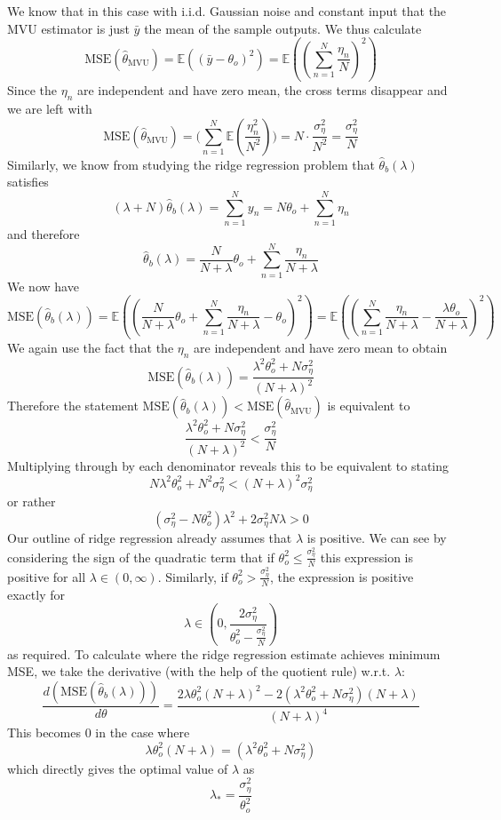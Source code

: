 \documentclass{article}
\newcommand{\chapternumber}{3}
\newenvironment{QandA}{\begin{enumerate}[label=\chapternumber.\arabic*]\bfseries\boldmath}
	{\end{enumerate}}
\newenvironment{answered}{\par\bigskip\normalfont\unboldmath}{}
\begin{document}
\begin{QandA}
	\begin{answered}
		We know that in this case with i.i.d. Gaussian noise and constant input that the MVU estimator is just $\bar{y}$ the mean of the sample outputs. We thus calculate
		\[\text{MSE}(\hat{\theta}_\text{MVU})=\mathbb{E}((\bar{y}-\theta_o)^2)=\mathbb{E}((\sum_{n=1}^{N}\frac{\eta_n}{N})^2)\]
		Since the $\eta_n$ are independent and have zero mean, the cross terms disappear and we are left with
		\[\text{MSE}(\hat{\theta}_\text{MVU})=\mathbb(\sum_{n=1}^{N}\mathbb{E}(\frac{\eta_n^2}{N^2}))=N\cdot\frac{\sigma_\eta^2}{N^2}=\frac{\sigma_\eta^2}{N}\]
		Similarly, we know from studying the ridge regression problem that $\hat{\theta}_b(\lambda)$ satisfies
		\[(\lambda+N)\hat{\theta}_b(\lambda)= \sum_{n=1}^{N}y_n=N\theta_o+\sum_{n=1}^{N}\eta_n\] 
		and therefore
		\[\hat{\theta}_b(\lambda)=\frac{N}{N+\lambda}\theta_o+\sum_{n=1}^{N}\frac{\eta_n}{N+\lambda}\]
		We now have
		\[\text{MSE}(\hat{\theta}_b(\lambda))=\mathbb{E}\left(\left(\frac{N}{N+\lambda}\theta_o+\sum_{n=1}^{N}\frac{\eta_n}{N+\lambda}-\theta_o\right)^2\right)=\mathbb{E}\left(\left(\sum_{n=1}^{N}\frac{\eta_n}{N+\lambda}-\frac{\lambda\theta_o}{N+\lambda}\right)^2\right)\]
		We again use the fact that the $\eta_n$ are independent and have zero mean to obtain
		\[\text{MSE}(\hat{\theta}_b(\lambda))=\frac{\lambda^2\theta_o^2+N\sigma_\eta^2}{(N+\lambda)^2}\]
		Therefore the statement $\text{MSE}(\hat{\theta}_b(\lambda))<\text{MSE}(\hat{\theta}_\text{MVU})$ is equivalent to
		\[\frac{\lambda^2\theta_o^2+N\sigma_\eta^2}{(N+\lambda)^2}<\frac{\sigma_\eta^2}{N}\]
		Multiplying through by each denominator reveals this to be equivalent to stating
		\[N\lambda^2\theta_o^2+N^2\sigma_\eta^2<(N+\lambda)^2\sigma_\eta^2\]
		or rather
		\[(\sigma_\eta^2-N\theta_o^2)\lambda^2+2\sigma_\eta^2N\lambda>0\]
		Our outline of ridge regression already assumes that $\lambda$ is positive. We can see by considering the sign of the quadratic term that if $\theta_o^2\leq\frac{\sigma_\eta^2}{N}$ this expression is positive for all $\lambda\in(0,\infty)$. Similarly, if $\theta_o^2>\frac{\sigma_\eta^2}{N}$, the expression is positive exactly for \[\lambda\in\left(0,\frac{2\sigma_\eta^2}{\theta_o^2-\frac{\sigma_\eta^2}{N}}\right)\]
		as required.
		To calculate where the ridge regression estimate achieves minimum MSE, we take the derivative (with the help of the quotient rule) w.r.t. $\lambda$:
		\[\frac{d(\text{MSE}(\hat{\theta}_b(\lambda)))}{d\theta}=\frac{2\lambda\theta_o^2(N+\lambda)^2-2(\lambda^2\theta_o^2+N\sigma_\eta^2)(N+\lambda)}{(N+\lambda)^4}\]
		This becomes 0 in the case where
		\[\lambda\theta_o^2(N+\lambda)=(\lambda^2\theta_o^2+N\sigma_\eta^2)\]
		which directly gives the optimal value of $\lambda$ as
		\[\lambda_*=\frac{\sigma_\eta^2}{\theta_o^2}\]
		

\end{answered}
\end{QandA}
\end{document}
